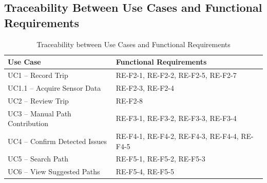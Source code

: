 \subsection{Traceability Between Use Cases and Functional Requirements}
\label{sec:uc_re_traceability}

\begin{table}[H]
\centering
\caption{Traceability between Use Cases and Functional Requirements}
\label{tab:uc_re_traceability}
  \begin{tabular}{@{}p{5.5cm}p{9cm}@{}}
  \toprule
  \textbf{Use Case} & \textbf{Functional Requirements} \\
  \midrule
  UC1 -- Record Trip &
  RE-F2-1, RE-F2-2, RE-F2-5, RE-F2-7 \\
  \midrule
  UC1.1 -- Acquire Sensor Data &
  RE-F2-3, RE-F2-4 \\
  \midrule
  UC2 -- Review Trip &
  RE-F2-8 \\
  \midrule
  UC3 -- Manual Path Contribution &
  RE-F3-1, RE-F3-2, RE-F3-3, RE-F3-4 \\
  \midrule
  UC4 -- Confirm Detected Issues &
  RE-F4-1, RE-F4-2, RE-F4-3, RE-F4-4, RE-F4-5 \\
  \midrule
  UC5 -- Search Path &
  RE-F5-1, RE-F5-2, RE-F5-3 \\
  \midrule
  UC6 -- View Suggested Paths &
  RE-F5-4, RE-F5-5 \\
  \bottomrule
  \end{tabular}
\end{table}



